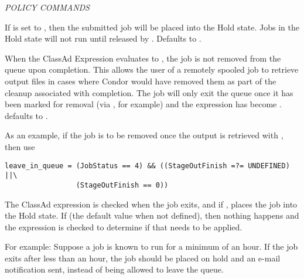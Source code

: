 \emph{POLICY COMMANDS}
\begin{description} 


\item[hold = $<$True \Bar\ False$>$] If  is set to
, then the submitted job will be placed into the Hold state.
Jobs in the Hold state will not run until released by .
Defaults to .


\item[leave\_in\_queue = $<$ClassAd Boolean Expression$>$]
When the ClassAd Expression evaluates to , the job is
not removed from the queue upon completion.
This allows the user of a remotely spooled job to retrieve output
files in cases where Condor would have removed them as part of
the cleanup associated with completion. The job will only exit
the queue once it has been marked for removal (via ,
for example) and the  expression has
become .
 defaults to .

As an example, if the job is to be removed once the output is retrieved
with , then use 
\footnotesize
\begin{verbatim}
leave_in_queue = (JobStatus == 4) && ((StageOutFinish =?= UNDEFINED) ||\
                 (StageOutFinish == 0))
\end{verbatim}
\normalsize


\item[on\_exit\_hold = $<$ClassAd Boolean Expression$>$] 
The ClassAd expression is checked when the job exits, and if ,
places the job into the Hold state.
If  (the default value when not defined),
then nothing happens and the  expression is
checked to determine if that needs to be applied.

For example:
Suppose a job is known to run for a minimum of an hour.
If the job exits after less than an hour, the job should be placed on
hold and an e-mail notification sent,
instead of being allowed to leave the queue.


\end{description}
